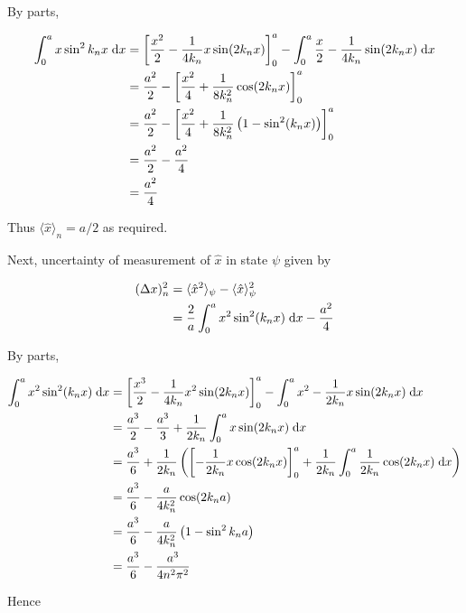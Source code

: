 \documentclass[a4paper]{article}
\begin{document}
By parts,

\begin{align*}
\int_{0}^{a}  x \sin^{2} k_{n} x \; \mathrm{d} x & = \left[  \frac{x^{2}}{2}  - \frac{1}{4 k_{n}} x \sin ( 2 k_{n} x ) \right]_{0}^{a} - \int_{0}^{a} \frac{x}{2}  - \frac{1}{4 k_{n}} \sin ( 2 k_{n} x ) \; \mathrm{d} x \\
& = \frac{a^{2}}{2} - \left[  \frac{x^{2}}{4}  + \frac{1}{8 k_{n}^{2}} \cos(2 k_{n} x)  \right]_{0}^{a} \\
& = \frac{a^{2}}{2} - \left[  \frac{x^{2}}{4}  + \frac{1}{8 k_{n}^{2}} \left( 1 - \sin^{2} (k_{n} x )   \right) \right]_{0}^{a}\\
& = \frac{a^{2}}{2} -  \frac{a^{2}}{4} \\
& = \frac{a^{2}}{4}
\end{align*}
  
Thus $ \langle \hat{x} \rangle_{n} = a / 2 $ as required.

Next, uncertainty of measurement of $ \hat{x} $ in state $ \psi $ given by

\begin{align*}
(\Delta x)_{n}^{2} & = \langle \hat{x}^{2} \rangle_{\psi} -  \langle \hat{x} \rangle_{\psi}^{2} \\
& = \frac{2}{a} \int_{0}^{a} x^{2} \sin^{2} (k_{n} x ) \; \mathrm{d} x - \frac{a^{2}}{4}
\end{align*}

By parts,

\begin{align*}
\int_{0}^{a} x^{2} \sin^{2} (k_{n} x ) \; \mathrm{d} x & = \left[  \frac{x^{3}}{2} - \frac{1}{4 k_{n}} x^{2} \sin(2k_{n} x)     \right]_{0}^{a} - \int_{0}^{a} x^{2} - \frac{1}{2 k_{n} } x \sin(2 k_{n} x) \; \mathrm{d} x    \\
& = \frac{a^{3}}{2} - \frac{a^{3}}{3} + \frac{1}{2 k_{n}} \int_{0}^{a} x \sin(2 k_{n} x) \;  \mathrm{d} x \\
& = \frac{a^{3}}{6} + \frac{1}{2 k_{n}} \left(  \left[  - \frac{1}{2 k_{n}} x \cos(2k _{n} x)  \right]_{0}^{a} + \frac{1}{2k_{n}} \int_{0}^{a} \frac{1}{2k_{n}} \cos(2k_{n} x) \; \mathrm{d} x  \right) \\
& = \frac{a^{3}}{6} - \frac{a}{4k_{n}^{2}} \cos (2 k_{n} a) \\
& = \frac{a^{3}}{6} - \frac{a}{4k_{n}^{2}} \left(  1 - \sin^{2} k_{n} a \right) \\
& =  \frac{a^{3}}{6}  - \frac{a^{3}}{4 n^{2}\pi^{2}}
\end{align*}

Hence
\end{document}
